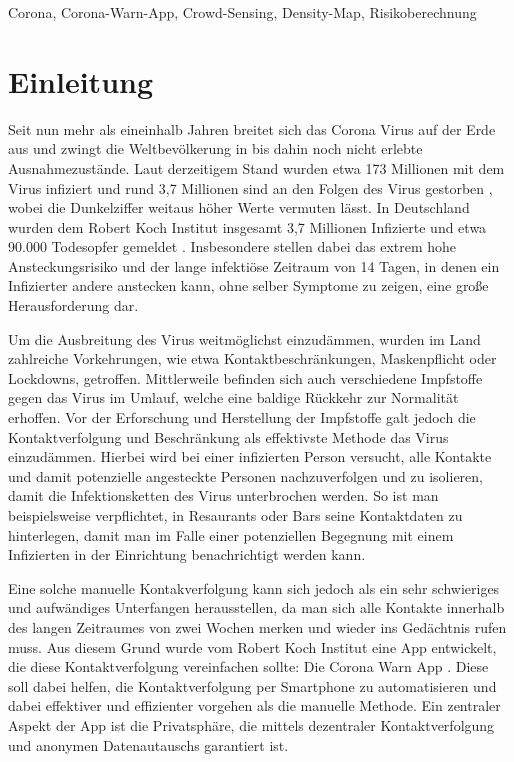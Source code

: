 \documentclass[conference,compsoc]{IEEEtran}
\begin{document}
\begin{IEEEkeywords}
Corona, Corona-Warn-App, Crowd-Sensing, Density-Map, Risikoberechnung
\end{IEEEkeywords}

\section{Einleitung} \label{Einleitung}
Seit nun mehr als eineinhalb Jahren breitet sich das Corona Virus auf der Erde aus und zwingt die Weltbevölkerung in bis dahin noch nicht erlebte Ausnahmezustände.
Laut derzeitigem Stand wurden etwa 173 Millionen mit dem Virus infiziert und rund 3,7 Millionen sind an den Folgen des Virus gestorben \cite{CoronaZahlenWorld}, wobei die Dunkelziffer weitaus höher Werte vermuten lässt. \cite{Dunkelziffer}
In Deutschland wurden dem Robert Koch Institut insgesamt 3,7 Millionen Infizierte und etwa 90.000 Todesopfer gemeldet \cite{CoronaZahlenDe}. 
Insbesondere stellen dabei das extrem hohe Ansteckungsrisiko und der lange infektiöse Zeitraum von 14 Tagen, in denen ein Infizierter andere anstecken kann, ohne selber Symptome zu zeigen, eine große Herausforderung dar.

Um die Ausbreitung des Virus weitmöglichst einzudämmen, wurden im Land zahlreiche Vorkehrungen, wie etwa Kontaktbeschränkungen, Maskenpflicht oder Lockdowns, getroffen. 
Mittlerweile befinden sich auch verschiedene Impfstoffe gegen das Virus im Umlauf, welche eine baldige Rückkehr zur Normalität erhoffen.
Vor der Erforschung und Herstellung der Impfstoffe galt jedoch die Kontaktverfolgung und Beschränkung als effektivste Methode das Virus einzudämmen. 
Hierbei wird bei einer infizierten Person versucht, alle Kontakte und damit potenzielle angesteckte Personen nachzuverfolgen und zu isolieren, damit die Infektionsketten des Virus unterbrochen werden.
So ist man beispielsweise verpflichtet, in Resaurants oder Bars seine Kontaktdaten zu hinterlegen, damit man im Falle einer potenziellen Begegnung mit einem Infizierten in der Einrichtung benachrichtigt werden kann.

Eine solche manuelle Kontakverfolgung kann sich jedoch als ein sehr schwieriges und aufwändiges Unterfangen herausstellen, 
da man sich alle Kontakte innerhalb des langen Zeitraumes von zwei Wochen merken und wieder ins Gedächtnis rufen muss.
Aus diesem Grund wurde vom Robert Koch Institut eine App entwickelt, die diese Kontaktverfolgung vereinfachen sollte: Die Corona Warn App \cite{CWA}. 
Diese soll dabei helfen, die Kontaktverfolgung per Smartphone zu automatisieren und dabei effektiver und effizienter vorgehen als die manuelle Methode.
Ein zentraler Aspekt der App ist die Privatsphäre, die mittels dezentraler Kontaktverfolgung und anonymen Datenautauschs garantiert ist.
\end{document}
